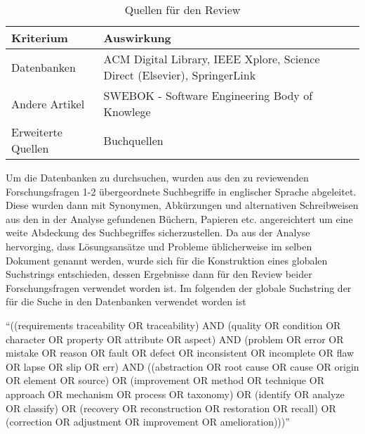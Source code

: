 \begin{table}[!ht]
\renewcommand{\arraystretch}{1.3}
\centering
\begin{threeparttable}
\begin{tabularx}{\columnwidth}{@{}lX@{}}
\toprule
Kriterium & Auswirkung\\ \midrule
Datenbanken & ACM Digital Library, IEEE Xplore, Science Direct (Elsevier), SpringerLink\\
Andere Artikel & SWEBOK - Software Engineering Body of Knowlege\\
Erweiterte Quellen & Buchquellen \\
\bottomrule
\end{tabularx}
\medskip
\end{threeparttable}
\caption{Quellen für den Review}
\label{tab:quellen_review}
\end{table}

Um die Datenbanken zu durchsuchen, wurden aus den zu reviewenden Forschungsfragen 1-2 übergeordnete Suchbegriffe in englischer Sprache abgeleitet. Diese wurden dann mit Synonymen, Abkürzungen und alternativen Schreibweisen aus den in der Analyse gefundenen Büchern, Papieren etc. angereichtert um eine weite Abdeckung des Suchbegriffes sicherzustellen. Da aus der Analyse hervorging, dass Lösungsansätze und Probleme üblicherweise im selben Dokument genannt werden, wurde sich für die Konstruktion eines globalen Suchstrings entschieden, dessen Ergebnisse dann für den Review beider Forschungsfragen verwendet worden ist. Im folgenden der globale Suchstring der für die Suche in den Datenbanken verwendet worden ist

\enquote{((requirements traceability OR traceability) AND (quality OR condition OR character OR property OR attribute OR aspect) AND (problem OR error OR mistake OR reason OR fault OR defect OR inconsistent OR incomplete OR flaw OR lapse OR slip OR err) AND ((abstraction OR root cause OR cause OR origin OR element OR source) OR (improvement OR method OR technique OR approach OR mechanism OR process OR taxonomy) OR (identify OR analyze OR classify) OR (recovery OR reconstruction OR restoration OR recall) OR (correction OR adjustment OR improvement OR amelioration)))}

